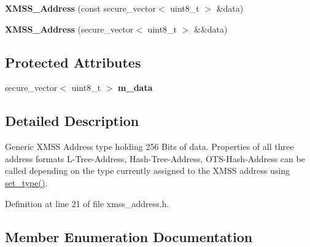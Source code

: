 \begin{DoxyCompactItemize}
\item 
\mbox{\label{class_botan_1_1_x_m_s_s___address_ac7a8dd49523446b990c44ad33dbbb47e}} 
{\bfseries X\+M\+S\+S\+\_\+\+Address} (const secure\+\_\+vector$<$ uint8\+\_\+t $>$ \&data)
\item 
\mbox{\label{class_botan_1_1_x_m_s_s___address_a07ce87c9817ac5a4fcb7073ddc5172e7}} 
{\bfseries X\+M\+S\+S\+\_\+\+Address} (secure\+\_\+vector$<$ uint8\+\_\+t $>$ \&\&data)
\end{DoxyCompactItemize}
\subsection*{Protected Attributes}
\begin{DoxyCompactItemize}
\item 
\mbox{\label{class_botan_1_1_x_m_s_s___address_a19bf13b793e3da15e9aa07fa00594a00}} 
secure\+\_\+vector$<$ uint8\+\_\+t $>$ {\bfseries m\+\_\+data}
\end{DoxyCompactItemize}


\subsection{Detailed Description}
Generic X\+M\+SS Address type holding 256 Bits of data. Properties of all three address formats L-\/\+Tree-\/\+Address, Hash-\/\+Tree-\/\+Address, O\+T\+S-\/\+Hash-\/\+Address can be called depending on the type currently assigned to the X\+M\+SS address using \mbox{\hyperlink{class_botan_1_1_x_m_s_s___address_a57148e8e415efce53531406607526236}{set\+\_\+type()}}. 

Definition at line 21 of file xmss\+\_\+address.\+h.



\subsection{Member Enumeration Documentation}
\mbox{\label{class_botan_1_1_x_m_s_s___address_a85146c0c3e049f62c413194049f501e3}} 
